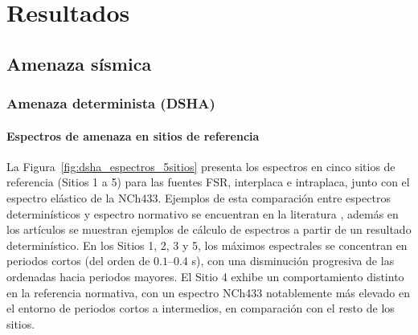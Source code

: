 
\chapter{Resultados}
\label{ch:resultados}

\section{Amenaza sísmica}
\label{sec:resultados_amenaza}

\subsection{Amenaza determinista (DSHA)}
\label{subsec:dsha}

\subsubsection{Espectros de amenaza en sitios de referencia}
\label{subsubsec:dsha_espectros}

La Figura~\ref{fig:dsha_espectros_5sitios} presenta los espectros en cinco sitios de referencia (Sitios 1 a 5) para las fuentes FSR, interplaca e intraplaca, junto con el espectro elástico de la NCh433. Ejemplos de esta comparación entre espectros determinísticos y espectro normativo se encuentran en la literatura \cite{Fasan2016CentralItalyEarthquakes,Benito2025SanJoseScenarios}, además en los artículos \cite{Gregor2014,Gregor2022} se muestran ejemplos de cálculo de espectros a partir de un resultado determinístico.  En los Sitios 1, 2, 3 y 5, los máximos espectrales se concentran en periodos cortos (del orden de $0.1$--$0.4$ s), con una disminución progresiva de las ordenadas hacia periodos mayores. El Sitio 4 exhibe un comportamiento distinto en la referencia normativa, con un espectro NCh433 notablemente más elevado en el entorno de periodos cortos a intermedios, en comparación con el resto de los sitios.

